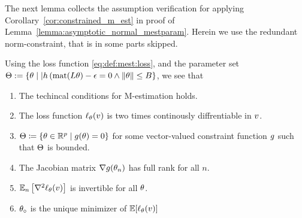 The next lemma collects the assumption verification for applying Corollary~\ref{cor:constrained_m_est} in proof of Lemma~\ref{lemma:asymptotic_normal_mestparam}. Herein we use the redundant norm-constraint, that is in some parts skipped.
\begin{lemma}
\label{lemma:mest:technicalities}
Using the loss function \eqref{eq:def:mest:loss}, and the parameter set $\Theta:=\{\theta \mid| h\left(\operatorname*{mat}(L\theta\right)-\epsilon = 0 \land \lVert\theta\rVert\leq B \}$, we see that
\begin{enumerate}
    \item The techincal conditions for M-estimation \citep[Theorem 12.2]{wooldridge_econometric_2010} holds.
    \item The loss function $\ell_\theta(v)$ is two times continously diffrentiable in $v$.
    \item $\Theta \coloneqq \{ \theta \in \mathbb R^p \mid g(\theta)=0\}$ for some vector-valued constraint function $g$ such that $\Theta $ is bounded.
    \item The Jacobian matrix $\nabla g( \theta_n)$ has full rank for all $n$.
    \item $\mathbb{E}_n \left[ \nabla^2 \ell_{\theta}(v)\right]$ is invertible for all $\theta$.
    \item $\theta_\circ$ is the unique minimizer of $ \mathbb{E}[\ell_\theta(v)]$
\end{enumerate}
\end{lemma}
